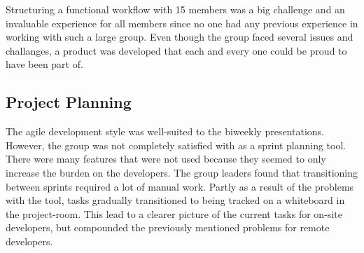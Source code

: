 Structuring a functional workflow with 15 members was a big challenge and an invaluable experience for all members since no one had any previous experience in working with such a large group. Even though the group faced several issues and challanges, a product was developed that each and every one could be proud to have been part of.

\subsection{Project Planning}
The agile development style was well-suited to the biweekly presentations. However, the group was not completely satisfied with \taiga{} as a sprint planning tool. There were many features that were not used because they seemed to only increase the burden on the developers. The group leaders found that transitioning between sprints required a lot of manual work. Partly as a result of the problems with the tool, tasks gradually transitioned to being tracked on a whiteboard in the project-room. This lead to a clearer picture of the current tasks for on-site developers, but compounded the previously mentioned problems for remote developers.

